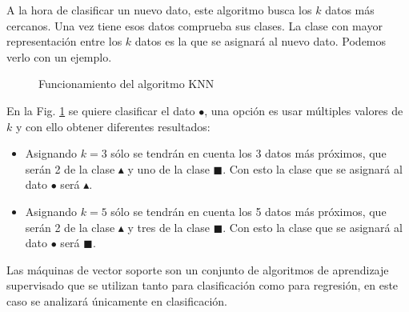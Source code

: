 A la hora de clasificar un nuevo dato, este algoritmo busca los $k$ datos más cercanos. Una vez tiene esos datos comprueba sus clases. La clase con mayor representación entre los $k$ datos es la que se asignará al nuevo dato. Podemos verlo con un ejemplo.

\begin{figure}[htpb!]
    \centering
    \caption{Funcionamiento del algoritmo KNN \cite{knnalgorithm2010}}
    \label{fig:knn_clasification}
\end{figure}

En la Fig. \ref{fig:knn_clasification} se quiere clasificar el dato \textcolor{verdedato}{\Large$\bullet$}, una opción es usar múltiples valores de $k$ y con ello obtener diferentes resultados:
\begin{itemize}
    \item Asignando $k = 3$ sólo se tendrán en cuenta los 3 datos más próximos, que serán 2 de la clase \textcolor{rojodato}{\large$\blacktriangle$} y uno de la clase \textcolor{azuldato}{$\blacksquare$}. Con esto la clase que se asignará al dato \textcolor{verdedato}{\Large$\bullet$} será \textcolor{rojodato}{\large$\blacktriangle$}.
    \item Asignando $k = 5$ sólo se tendrán en cuenta los 5 datos más próximos, que serán 2 de la clase \textcolor{rojodato}{\large$\blacktriangle$} y tres de la clase \textcolor{azuldato}{$\blacksquare$}. Con esto la clase que se asignará al dato \textcolor{verdedato}{\Large$\bullet$} será \textcolor{azuldato}{$\blacksquare$}.
\end{itemize}


Las máquinas de vector soporte son un conjunto de algoritmos de aprendizaje supervisado que se utilizan tanto para clasificación como para regresión, en este caso se analizará únicamente en clasificación.

